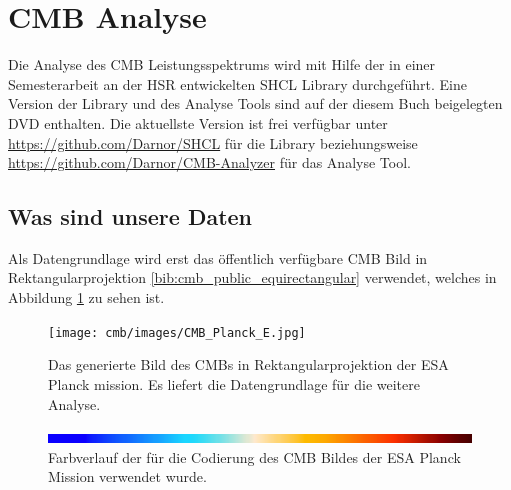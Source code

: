 \section{CMB Analyse}

Die Analyse des CMB Leistungsspektrums wird mit Hilfe der in einer 
Semesterarbeit an der HSR entwickelten SHCL Library durchgeführt. Eine Version 
der Library und des Analyse Tools sind auf der diesem Buch beigelegten DVD 
enthalten. Die aktuellste Version ist frei verfügbar unter 
\url{https://github.com/Darnor/SHCL} für die Library beziehungsweise 
\url{https://github.com/Darnor/CMB-Analyzer} für das Analyse Tool.

\subsection{Was sind unsere Daten}
Als Datengrundlage wird erst das öffentlich verfügbare CMB Bild in 
Rektangularprojektion \ref{bib:cmb_public_equirectangular} verwendet, welches 
in Abbildung \ref{fig:cmb-rectangular} zu sehen ist.

\begin{figure}
	\centering
	\texttt{[image: cmb/images/CMB\_Planck\_E.jpg]}
	\caption{Das generierte Bild des CMBs in Rektangularprojektion der ESA 
	Planck mission. Es liefert die Datengrundlage für die weitere Analyse.}
	\label{fig:cmb-rectangular}
\end{figure}



\begin{figure}
	\centering
	\includegraphics[width=\linewidth]{cmb/images/color-strip-full.png}
	\caption{Farbverlauf der für die Codierung des CMB Bildes der ESA Planck 
		Mission verwendet wurde.}
	\label{fig:color-strip-orig}
\end{figure}

